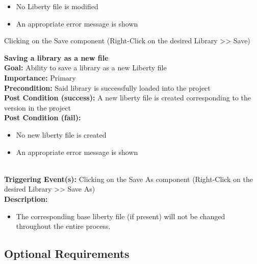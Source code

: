 \documentclass[10pt,a4paper]{report}
\newcommand{\precondition}[1]{
    \textbf{Precondition: } #1 \leavevmode \\
}
\newcommand{\FRDescription}[8]{
    \textbf{#1} \leavevmode \\
    \textbf{Goal: } #2 \leavevmode \\
    \textbf{Importance: } #3 \leavevmode \\
    \precondition{#4}
    \textbf{Post Condition (success): } #5 \leavevmode \\
    \textbf{Post Condition (fail): } #6 \leavevmode \\
    \textbf{Triggering Event(s): } #7 \leavevmode \\
    \textbf{Description: } \leavevmode \\ 
    #8}
\begin{document}
\begin{FR}
{\begin{itemize}
        \item No Liberty file is modified
        \item An appropriate error message is shown
    \end{itemize}}
    {Clicking on the Save component (Right-Click on the desired Library  >> Save)}
    \item \FRDescription{Saving a library as a new file}
    {Ability to save a library as a new Liberty file}
    {Primary}
    {Said library is successfully loaded into the project}
    {A new liberty file is created corresponding to the version in the project}
    {\begin{itemize}
        \item No new liberty file is created
        \item An appropriate error message is shown
    \end{itemize}}
    {Clicking on the Save As component (Right-Click on the desired Library  >> Save As)}
    {\begin{itemize}
        \item The corresponding base liberty file (if present) will not be changed throughout the entire process.
    \end{itemize}}
\end{FR}

\subsection{Optional Requirements}
\end{document}
